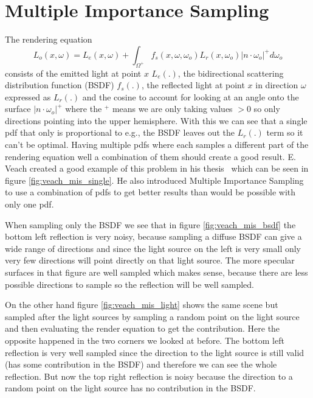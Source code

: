 \section{Multiple Importance Sampling}
\label{sec:multiple_importance_sampling}
The rendering equation
\begin{equation}
    \label{eq:rendering_equation}
    L_o(x, \omega) = L_e(x, \omega) + \int_{\Omega^+} f_s(x, \omega, \omega_o) L_r(x, \omega_o) |n \cdot \omega_o|^+ d\omega_o
\end{equation}
consists of the emitted light at point $ x $ $ L_e(.) $,
the bidirectional scattering distribution function (BSDF) $ f_s(.) $,
the reflected light at point $ x $ in direction $ \omega $ expressed as $ L_r(.) $
and the cosine to account for looking at an angle onto the surface $ |n \cdot \omega_o|^+ $
where the $ ^+ $ means we are only taking values $ > 0 $ so only directions pointing into the upper hemisphere.
With this we can see that a single pdf that only is proportional to e.g., the BSDF leaves out the $ L_r(.) $ term so it can't be optimal.
Having multiple pdfs where each samples a different part of the rendering equation well
a combination of them should create a good result.
E. Veach created a good example of this problem in his thesis \cite{veach-thesis} which can be seen in figure \ref{fig:veach_mis_single}.
He also introduced Multiple Importance Sampling to use a combination of pdfs to get better results than would be possible with only one pdf.

When sampling only the BSDF we see that in figure \ref{fig:veach_mis_bsdf} the bottom left reflection is very noisy,
because sampling a diffuse BSDF can give a wide range of directions
and since the light source on the left is very small only very few directions will point directly on that light source.
The more specular surfaces in that figure are well sampled which makes sense,
because there are less possible directions to sample so the reflection will be well sampled.

On the other hand figure \ref{fig:veach_mis_light} shows the same scene but sampled after the light sources
by sampling a random point on the light source and then evaluating the render equation to get the contribution.
Here the opposite happened in the two corners we looked at before.
The bottom left reflection is very well sampled
since the direction to the light source is still valid (has some contribution in the BSDF) and therefore we can see the whole reflection.
But now the top right reflection is noisy because the direction to a random point on the light source has no contribution in the BSDF.

